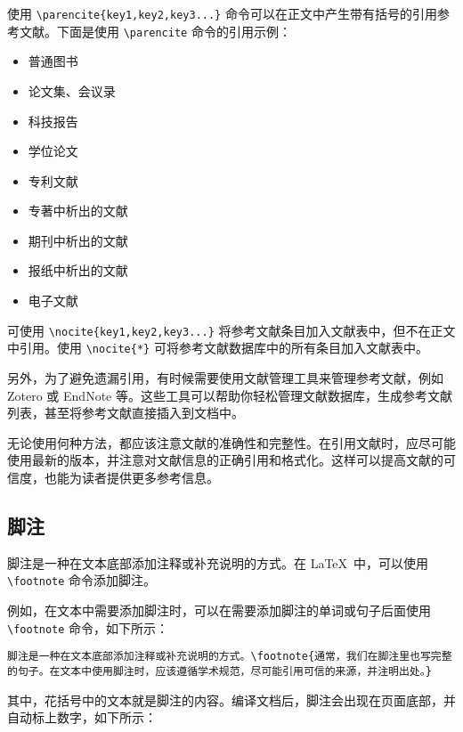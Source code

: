 使用 \verb|\parencite{key1,key2,key3...}| 命令可以在正文中产生带有括号的引用参考文献。下面是使用 \verb|\parencite| 命令的引用示例：
\begin{itemize}
  \item 普通图书\parencite{book1,book2}
  \item 论文集、会议录\parencite{conf1,conf2}
  \item 科技报告\parencite{techreport1,techreport2}
  \item 学位论文\parencite{thesis1,thesis2,thesis3}
  \item 专利文献\parencite{patent1,patent2}
  \item 专著中析出的文献\parencite{inbook1,inbook2}
  \item 期刊中析出的文献\parencite{qin2021,article1,article2}
  \item 报纸中析出的文献\parencite{newspaper1,newspaper2}
  \item 电子文献\parencite{online1,online2,online3}
\end{itemize}


可使用 \verb|\nocite{key1,key2,key3...}| 将参考文献条目加入文献表中，但不在正文中引用。使用 \verb|\nocite{*}| 可将参考文献数据库中的所有条目加入文献表中。

另外，为了避免遗漏引用，有时候需要使用文献管理工具来管理参考文献，例如 Zotero 或 EndNote 等。这些工具可以帮助你轻松管理文献数据库，生成参考文献列表，甚至将参考文献直接插入到文档中。

无论使用何种方法，都应该注意文献的准确性和完整性。在引用文献时，应尽可能使用最新的版本，并注意对文献信息的正确引用和格式化。这样可以提高文献的可信度，也能为读者提供更多参考信息。

\subsection{脚注}

脚注是一种在文本底部添加注释或补充说明的方式。在 \LaTeX\ 中，可以使用 \verb|\footnote| 命令添加脚注。

例如，在文本中需要添加脚注时，可以在需要添加脚注的单词或句子后面使用 \verb|\footnote| 命令，如下所示：

\begin{Verbatim}
脚注是一种在文本底部添加注释或补充说明的方式。\footnote{通常，我们在脚注里也写完整的句子。在文本中使用脚注时，应该遵循学术规范，尽可能引用可信的来源，并注明出处。}
\end{Verbatim}

其中，花括号中的文本就是脚注的内容。编译文档后，脚注会出现在页面底部，并自动标上数字，如下所示：

